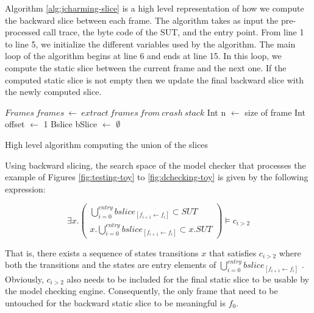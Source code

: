 \documentclass[times]{smrauth}
\begin{document}
Algorithm \ref{alg:jcharming-slice} is a high level
representation of how we compute the backward slice between
each frame. The algorithm takes as input the pre-processed
call trace, the byte code of the SUT, and the entry point. From
line 1 to line 5, we initialize the different variables used by the
algorithm. The main loop of the algorithm begins at line 6 and
ends at line 15. In this loop, we compute the static slice
between the current frame and the next one. If the computed
static slice is not empty then we update the final backward
slice with the newly computed slice.


\begin{algorithm}[H]
 $Frames~frames~\leftarrow~extract~frames~from~crash~stack$\;
 Int n $\leftarrow$ size of frame\;
 Int offset $\leftarrow$ 1\;
 Bslice bSlice $\leftarrow$ $\emptyset$\;
\caption{High level algorithm computing the union of the slices\label{alg:jcharming-slice}}
\end{algorithm}

Using backward slicing, the search space of the model checker
that processes the example of Figures \ref{fig:testing-toy} to \ref{fig:dchecking-toy} is given by the
following expression:

\begin{equation}
  \exists x.
  \begin{pmatrix}
    \bigcup_{i=0}^{entry} bslice_{[f_{i+1} \leftarrow f_i]}  \subset SUT \\
    x.\bigcup_{i=0}^{entry} bslice_{[f_{i+1} \leftarrow f_i]}  \subset x.SUT
  \end{pmatrix}
  \models c_{i>2}
\end{equation}

That is, there exists a sequence of states transitions $x$ that
satisfies $c_{i>2}$ where both the transitions and the states are
entry
elements of $\bigcup_{i=0}^{entry} bslice_{[f_{i+1} \leftarrow f_i]}$ . Obviously, $c_{i>2}$ also
needs to be included for the final static slice to be usable by
the model checking engine. Consequently, the only frame that
need to be untouched for the backward static slice to be
meaningful is $f_0$.
\end{document}
